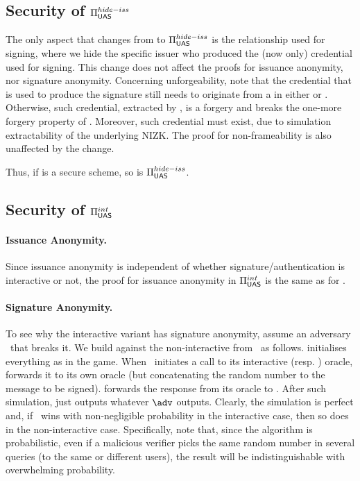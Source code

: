 \subsection{Security of $\Pi_{\mathsf{UAS}}^{hide-iss}$}
\label{sapp:sec-hide-iss}

The only aspect that changes from \CUASGen to $\Pi_{\mathsf{UAS}}^{hide-iss}$ is the
relationship used for signing, where we hide the specific issuer who produced
the (now only) credential used for signing.
%
This change does not affect the proofs for issuance anonymity, nor signature
anonymity.
%
Concerning unforgeability, note that the credential that is used to produce the
\UAS signature still needs to originate from a \uid in either \HU or \CU.
Otherwise, such credential, extracted by \ExtractSign, is a forgery and breaks
the one-more forgery property of \SBCM. Moreover, such credential must exist,
due to simulation extractability of the underlying NIZK.
%
The proof for non-frameability is also unaffected by the change.

Thus, if \CUASGen is a secure \UAS scheme, so is $\Pi_{\mathsf{UAS}}^{hide-iss}$.

\subsection{Security of $\Pi_{\mathsf{UAS}}^{int}$}
\label{sapp:sec-interactive}

\paragraph{Issuance Anonymity.} Since issuance anonymity is independent of
whether signature/authentication is interactive or not, the proof for issuance
anonymity in $\Pi_{\mathsf{UAS}}^{int}$ is the same as for \CUASGen.

\paragraph{Signature Anonymity.} To see why the interactive variant has
signature anonymity, assume an adversary \adv~that breaks it. We build \advB
against the non-interactive \ExpSigAnonb from \adv~as follows. \advB initialises
everything as in the \ExpSigAnonb game. When \adv~initiates a call to its
interactive \SIGN (resp. \CHALb) oracle, \advB forwards it to its own oracle
(but concatenating the random number to the message to be signed). \advB
forwards the response from its oracle to \adv. After such simulation, \advB just
outputs whatever $\adv$ outputs. Clearly, the simulation is perfect and, if
\adv~wins with non-negligible probability in the interactive case, then so
does \advB in the non-interactive case. Specifically, note that, since the \Sign
algorithm is probabilistic, even if a malicious verifier picks the same random
number in several queries (to the same or different users), the result will be
indistinguishable with overwhelming probability.

